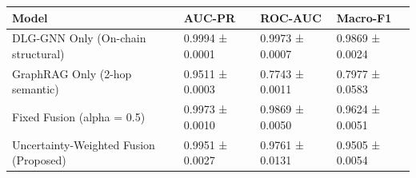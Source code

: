 \begin{tabular}{llll}
\toprule
Model & AUC-PR & ROC-AUC & Macro-F1 \\
\midrule
DLG-GNN Only (On-chain structural) & 0.9994 ± 0.0001 & 0.9973 ± 0.0007 & 0.9869 ± 0.0024 \\
GraphRAG Only (2-hop semantic) & 0.9511 ± 0.0003 & 0.7743 ± 0.0011 & 0.7977 ± 0.0583 \\
Fixed Fusion (alpha = 0.5) & 0.9973 ± 0.0010 & 0.9869 ± 0.0050 & 0.9624 ± 0.0051 \\
Uncertainty-Weighted Fusion (Proposed) & 0.9951 ± 0.0027 & 0.9761 ± 0.0131 & 0.9505 ± 0.0054 \\
\bottomrule
\end{tabular}
